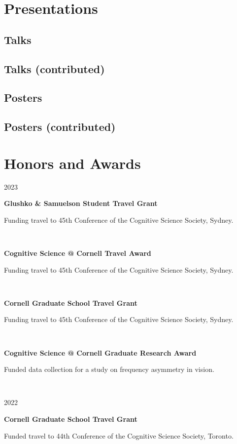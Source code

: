 \documentclass{article}
\newcommand{\awardentry}[3]{
  \begin{minipage}[t]{.15\textwidth}
    \begin{flushright}
      \hfill {#1}
    \end{flushright}
  \end{minipage}
  \hfill\vline\hfill
  \begin{minipage}[t]{.80\textwidth}
    \textbf{#2}

    \footnotesize{#3}
  \end{minipage}\\\vspace{.25cm}
}
\begin{document}

\section{Presentations}

\subsection{Talks}
\nocite{*}
\printbibliography[heading=none]

\subsection{Talks (contributed)}
\nocite{*}
\printbibliography[heading=none]

\subsection{Posters}
\nocite{*}
\printbibliography[heading=none]

\subsection{Posters (contributed)}
\nocite{*}
\printbibliography[heading=none]


\section{Honors and Awards}

\awardentry{2023}{Glushko \& Samuelson Student Travel Grant}
{Funding travel to 45th Conference of the Cognitive Science Society, Sydney.}

\awardentry{}{Cognitive Science @ Cornell Travel Award}
{Funding travel to 45th Conference of the Cognitive Science Society, Sydney.}

\awardentry{}{Cornell Graduate School Travel Grant}
{Funding travel to 45th Conference of the Cognitive Science Society, Sydney.}

\awardentry{}{Cognitive Science @ Cornell Graduate Research Award}
{Funded data collection for a study on frequency asymmetry in vision.}

\awardentry{2022}{Cornell Graduate School Travel Grant}
{Funded travel to 44th Conference of the Cognitive Science Society, Toronto.}
\end{document}
